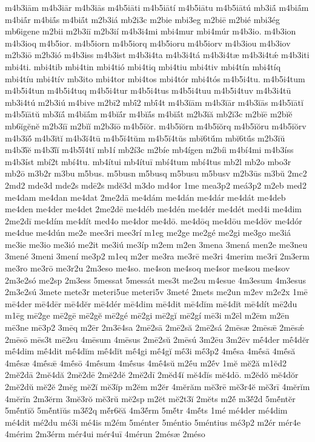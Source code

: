 {m4b3iām
m4b3iār
m4b3iās
m4b5iāti
m4b5iātí
m4b5iātu
m4b5iātú
mb3iā́
m4biā́m
m4biā́r
m4biā́s
m4biā́t
m2b3iá
mb2i3c
m2bie
mbi3eg
m2biē
m2bié
mbi3ég
mb6igene
m2bii
m2b3iī
m2b3ií
m4b3i4mi
mbi4mur
mbi4múr
m4b3io.
m4b3ion
m4b3ioq
m4b5ior.
m4b5iorn
m4b5iorq
m4b5ioru
m4b5iorv
m4b3iou
m4b3iov
m2b3iō
m2b3ió
m4b3iss
m4b3ist
m4b3i4ta
m4b3i4tá
m4b3i4tæ
m4b3i4tǽ
m4b3iti
mbi4ti.
mbi4tib
mbi4tin
mbi4tió
mbi4tiq
mbi4tiu
mbi4tiv
mbi4tín
mbi4tíq
mbi4tíu
mbi4tív
mb3ito
mbi4tor
mbi4tos
mbi4tór
mbi4tós
m4b5i4tu.
m4b5i4tum
m4b5i4tun
m4b5i4tuq
m4b5i4tur
m4b5i4tus
m4b5i4tuu
m4b5i4tuv
m4b3i4tū
mb3i4tú
m2b3iú
m4bive
m2bī2
mbī́2
mbī́4t
m4b3ĭām
m4b3ĭār
m4b3ĭās
m4b5ĭātĭ
m4b5ĭātŭ
mb3ĭā́
m4bĭā́m
m4bĭā́r
m4bĭā́s
m4bĭā́t
m2b3ĭă
mb2ĭ3c
m2bĭē
m2bĭĕ
mb6ĭgĕnĕ
m2b3ĭī
m2bĭĭ
m2b3ĭō
m4b5ĭŏr.
m4b5ĭŏrn
m4b5ĭŏrq
m4b5ĭŏru
m4b5ĭŏrv
m4b3ĭŏ́
m4b3ĭtĭ
m4b3ĭ4tū
m4b5ĭ4tŭm
m4b5ĭ4tŭs
mbĭ6tŭ́m
mbĭ6tŭ́s
m2b3ĭŭ
m4b3ĭ́ĕ
m4b3ĭ́ĭ
m4b5ĭ́4tĭ
mb1í
mb2í3c
m2bíe
mb4ígen
m2bíi
m4bí4mi
m4b3íss
m4b3íst
mbí2t
mbí4tu.
mb4ítui
mb4ítuī
mbí4tum
mbí4tus
mb2l
mb2o
mbo3r
mb2ō
m3b2r
m3bu
m5bus.
m5busn
m5busq
m5busu
m5busv
m2b3ūs
m3bŭ
2mc2
2md2
mde3d
mde2s
mdē2s
mdĕ3d
m3do
md4or
1me
mea3p2
meá3p2
m2eb
med2
me4dam
me4dan
me4dat
2me2dā
me4dám
me4dán
me4dár
me4dát
me4deb
me4den
me4der
me4det
2me2dē
me4déb
me4dén
me4dér
me4dét
med4i
me4dim
2me2dī
me4dím
me4dít
med4o
me4dor
me4dō.
me4dōq
me4dōu
me4dōv
me4dór
me4due
me4dún
me2e
mee3ri
mee3rí
m1eg
me2ge
me2gé
me2gi
me3go
me3iá
me3ie
me3io
me3ió
me2it
me3iú
me3íp
m2em
m2en
3mena
3mená
men2e
me3neu
3mené
3meni
3mení
me3p2
m1eq
m2er
me3ra
me3rē
me3ri
4merim
me3rī
2m3erm
me3ro
me3rō
me3r2u
2m3eso
me4so.
me4son
me4soq
me4sor
me4sou
me4sov
2m3e2só
me2sp
2m3ess
5messat
5messát
mes3t
me2su
m4esue
4m3esum
4m3esus
2m3e2sú
3mete
mete3r
meteri5ue
meteri5v
3meté
2mets
me2un
m2ev
m2e2x
1mē
mē4der
mē4dēr
mē4dĕr
mē4dér
mē4dim
mē4dit
mē4dĭm
mē4dĭt
mē4dít
mē2du
m1ēg
mē2ge
mē2gē
mē2gĕ
mē2gé
mē2gi
mē2gĭ
mē2gí
mē3i
m2ēl
m2ēm
m2ēn
mē3ne
mē3p2
3mēq
m2ēr
2m3ē4sa
2mē2sā
2mē2să
2mē2sá
2mēsæ
2mēsǣ
2mēsǽ
2mēsō
mēs3t
mē2su
4mēsum
4mēsus
2mē2sŭ
2mēsú
3m2ēu
3m2ēv
mḗ4der
mḗ4dĕr
mḗ4dim
mḗ4dit
mḗ4dĭm
mḗ4dĭt
mḗ4gi
mḗ4gĭ
mḗ3i
mḗ3p2
4mḗsa
4mḗsā
4mḗsă
4mḗsæ
4mḗsǣ
4mḗsō
4mḗsum
4mḗsus
4mḗ4sŭ
m2ḗu
m2ḗv
1mĕ
mĕ2ă
m1ĕd2
2mĕ2dā
2mĕ4dă
2mĕ2dē
2mĕ2dĕ
2mĕ2dī
2mĕd4ĭ
mĕ4dĭs
mĕ4dō.
m2ĕdŏ
mĕ4dŏr
2mĕ2dŭ
mĕ2ĕ
2mĕg
mĕ2ĭ
mĕ3ĭp
m2ĕm
m2ĕr
4mĕrăm
mĕ3rē
mĕ3r4ĕ
mĕ3rī
4mĕrĭm
4mĕrĭn
2m3ĕrm
3mĕ3rŏ
mĕ3rŭ
mĕ2sp
m2ĕt
mĕ2t3ĭ
2mĕts
m2ĕ́
m3ĕ́2d
5mĕ́ntĕr
5mĕ́ntĭŏ
5mĕ́ntĭŭs
m3ĕ́2q
mĕ́r6ĕă
4m3ĕ́rm
5mĕ́tr
4mĕ́ts
1mé
mé4der
mé4dim
mé4dit
mé2du
mé3i
mé4is
m2ém
5ménter
5méntio
5méntius
mé3p2
m2ér
mér4e
4mérim
2m3érm
mér4ui
mér4uī
4mérun
2mésæ
2méso
}
